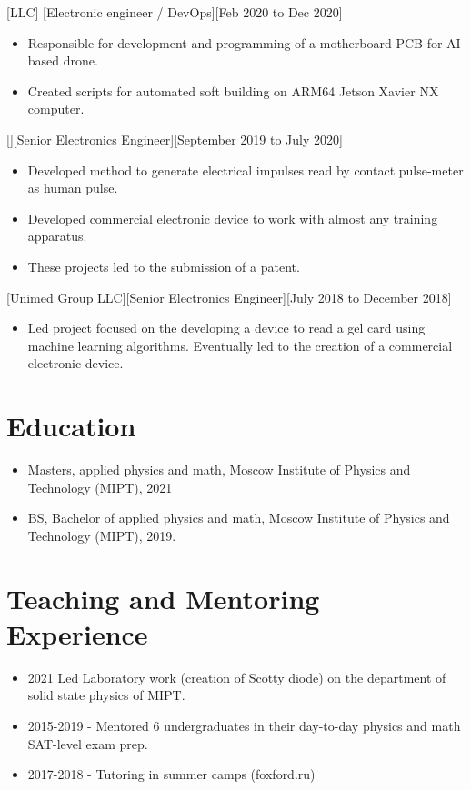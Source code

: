 \documentclass{article}
\begin{document}
[LLC]
[Electronic engineer / DevOps][Feb 2020 to Dec 2020]
 
\begin{itemize}
\item Responsible for development and programming of a motherboard PCB for AI based drone.
\item Created scripts for automated soft building on ARM64 Jetson Xavier NX computer.
\end{itemize}
 
 
[][Senior Electronics Engineer][September 2019 to July 2020]
 
\begin{itemize}
\item Developed method to generate electrical impulses read by contact pulse-meter as human pulse.
\item Developed commercial electronic device to work with almost any training apparatus.
\item These projects led to the submission of a patent.
\end{itemize}
 
[Unimed Group LLC][Senior Electronics Engineer][July 2018 to December 2018]
 
\begin{itemize}
\item Led project focused on the developing a device to read a gel card using machine learning algorithms. Eventually led to the creation of a commercial electronic device.
\end{itemize}
 
 
\section{Education}
 
\begin{itemize}
\item Masters, applied physics and math, Moscow Institute of Physics and Technology (MIPT), 2021
\item BS, Bachelor of applied physics and math, Moscow Institute of Physics and Technology (MIPT), 2019.
\end{itemize}
 
\section{Teaching and Mentoring Experience }
\begin{itemize}
\item 2021 Led Laboratory work (creation of Scotty diode) on the department of solid state physics of MIPT. 
\item 2015-2019 - Mentored 6 undergraduates in their day-to-day physics and math SAT-level exam prep.
\item 2017-2018 - Tutoring in summer camps (foxford.ru)
\end{itemize}
 
\end{document}
